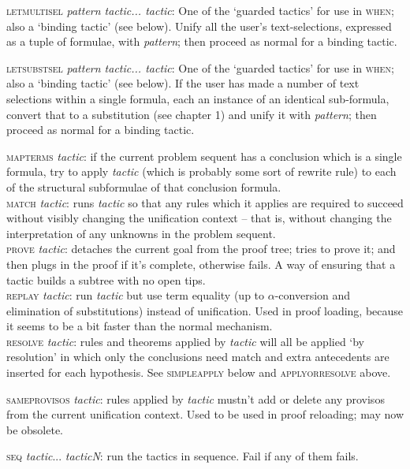 \documentclass[11pt]{book}
\begin{document}
\textsc{letmultisel} \textit{pattern tactic... tactic}: One of the `guarded tactics' for use in \textsc{when}; also a `binding tactic' (see below). Unify all the user's text-selections, expressed as a tuple of formulae, with \textit{pattern}; then proceed as normal for a binding tactic.


\textsc{letsubstsel} \textit{pattern tactic... tactic}: One of the `guarded tactics' for use in \textsc{when}; also a `binding tactic' (see below). If the user has made a number of text selections within a single formula, each an instance of an identical sub-formula, convert that to a substitution (see chapter 1) and unify it with \textit{pattern}; then proceed as normal for a binding tactic.


\textsc{mapterms} \textit{tactic}: if the current problem sequent has a conclusion which is a single formula, try to apply \textit{tactic} (which is probably some sort of rewrite rule) to each of the structural subformulae of that conclusion formula.\\
\textsc{match} \textit{tactic}: runs \textit{tactic} so that any rules which it applies are required to succeed without visibly changing the unification context -- that is, without changing the interpretation of any unknowns in the problem sequent.\\
\textsc{prove} \textit{tactic}: detaches the current goal from the proof tree; tries to prove it; and then plugs in the proof if it's complete, otherwise fails. A way of ensuring that a tactic builds a subtree with no open tips.\\
\textsc{replay} \textit{tactic}: run \textit{tactic} but use term equality (up to \ensuremath{\alpha}-conversion and elimination of substitutions) instead of unification. Used in proof loading, because it seems to be a bit faster than the normal mechanism.\\
\textsc{resolve} \textit{tactic}: rules and theorems applied by \textit{tactic} will all be applied `by resolution' in which only the conclusions need match and extra antecedents are inserted for each hypothesis. See \textsc{simpleapply} below and \textsc{applyorresolve} above.


\textsc{sameprovisos} \textit{tactic}: rules applied by \textit{tactic} mustn't add or delete any provisos from the current unification context. Used to be used in proof reloading; may now be obsolete.


\textsc{seq} \textit{tactic}... \textit{tacticN}: run the tactics in sequence. Fail if any of them fails.
\end{document}
